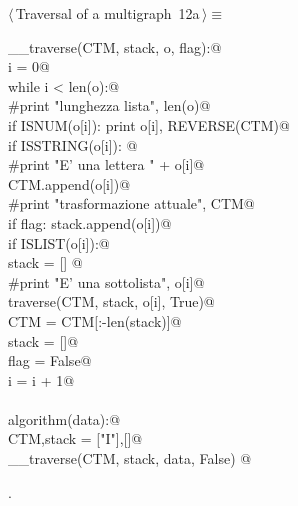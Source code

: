 \documentclass[11pt,oneside]{article}	%
\begin{document}
\begin{flushleft} \small \label{scrap24}
\protect{}$\langle\,$Traversal of a multigraph\nobreak\ {\footnotesize 12a}$\,\rangle\equiv$
\vspace{-1ex}
\begin{list}{}{} \item
\mbox{}\verb@def __traverse(CTM, stack, o, flag):@\\
\mbox{}\verb@    i = 0@\\
\mbox{}\verb@    while i < len(o):@\\
\mbox{}\verb@        #print "lunghezza lista", len(o)@\\
\mbox{}\verb@        if ISNUM(o[i]): print o[i], REVERSE(CTM)@\\
\mbox{}\verb@        if ISSTRING(o[i]): @\\
\mbox{}\verb@            #print "E' una lettera " + o[i]@\\
\mbox{}\verb@            CTM.append(o[i])@\\
\mbox{}\verb@            #print "trasformazione attuale", CTM@\\
\mbox{}\verb@            if flag: stack.append(o[i])@\\
\mbox{}\verb@        if ISLIST(o[i]):@\\
\mbox{}\verb@            stack = [] @\\
\mbox{}\verb@            #print "E' una sottolista", o[i]@\\
\mbox{}\verb@            traverse(CTM, stack, o[i], True)@\\
\mbox{}\verb@            CTM = CTM[:-len(stack)]@\\
\mbox{}\verb@            stack = []@\\
\mbox{}\verb@            flag = False@\\
\mbox{}\verb@        i = i + 1@\\
\mbox{}\verb@@\\
\mbox{}\verb@def algorithm(data):@\\
\mbox{}\verb@    CTM,stack = ["I"],[]@\\
\mbox{}\verb@    __traverse(CTM, stack, data, False)  @\\
\mbox{}\verb@@{\NWsep}
\end{list}
\vspace{-1ex}
\footnotesize\addtolength{\baselineskip}{-1ex}
\begin{list}{}{\setlength{\itemsep}{-\parsep}\setlength{\itemindent}{-\leftmargin}}
\item {\NWtxtMacroNoRef}.
\end{list}
\end{flushleft}
\end{document}
